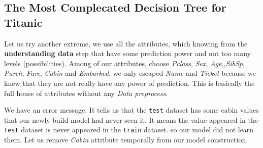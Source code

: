 \documentclass[
]{book}
\newenvironment{Shaded}{\begin{snugshade}}{\end{snugshade}}
\newcommand{\CommentTok}[1]{\textcolor[rgb]{0.56,0.35,0.01}{\textit{#1}}}
\newcommand{\DataTypeTok}[1]{\textcolor[rgb]{0.13,0.29,0.53}{#1}}
\newcommand{\KeywordTok}[1]{\textcolor[rgb]{0.13,0.29,0.53}{\textbf{#1}}}
\newcommand{\NormalTok}[1]{#1}
\newcommand{\OperatorTok}[1]{\textcolor[rgb]{0.81,0.36,0.00}{\textbf{#1}}}
\newcommand{\OtherTok}[1]{\textcolor[rgb]{0.56,0.35,0.01}{#1}}
\newcommand{\StringTok}[1]{\textcolor[rgb]{0.31,0.60,0.02}{#1}}
\begin{document}
\hypertarget{the-most-complecated-decision-tree-for-titanic}{%
\subsection{The Most Complecated Decision Tree for Titanic}\label{the-most-complecated-decision-tree-for-titanic}}

Let us try another extreme, we use all the attributes, which knowing from the \textbf{understanding data} step that have some prediction power and not too many levels (possibilities). Among of our attributes, choose \emph{Pclass}, \emph{Sex}, \emph{Age},,\emph{SibSp}, \emph{Parch}, \emph{Fare}, \emph{Cabin} and \emph{Embarked}, we only escaped \emph{Name} and \emph{Ticket} because we knew that they are not really have any power of prediction. This is basically the full house of attributes without any \emph{Data preprocess}.

We have an error message. It tells us that the \texttt{test} dataset has some cabin values that our newly build model had never seen it. It means the value appeared in the \texttt{test} dataset is never appeared in the \texttt{train} dataset. so our model did not learn them. Let us remove \emph{Cabin} attribute temporally from our model construction.

\begin{Shaded}
\end{Shaded}
\end{document}
